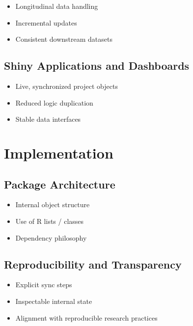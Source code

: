 \begin{itemize}
\tightlist
\item
  Longitudinal data handling\\
\item
  Incremental updates\\
\item
  Consistent downstream datasets
\end{itemize}

\subsection{Shiny Applications and Dashboards}\label{shiny-applications-and-dashboards}

\begin{itemize}
\tightlist
\item
  Live, synchronized project objects\\
\item
  Reduced logic duplication\\
\item
  Stable data interfaces
\end{itemize}

\section{Implementation}\label{implementation}

\subsection{Package Architecture}\label{package-architecture}

\begin{itemize}
\tightlist
\item
  Internal object structure\\
\item
  Use of R lists / classes\\
\item
  Dependency philosophy
\end{itemize}

\subsection{Reproducibility and Transparency}\label{reproducibility-and-transparency}

\begin{itemize}
\tightlist
\item
  Explicit sync steps\\
\item
  Inspectable internal state\\
\item
  Alignment with reproducible research practices
\end{itemize}

